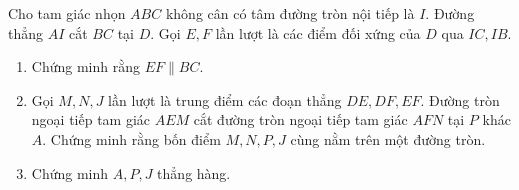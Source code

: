 \begin{ex}%
Cho tam giác nhọn $ABC$ không cân có tâm đường tròn nội tiếp là $I$. Đường thẳng $AI$ cắt $BC$ tại $D$. Gọi $E,F$ lần lượt là các điểm đối xứng của $D$ qua $IC,IB$.
\begin{enumerate}
	\item Chứng minh rằng $EF\parallel BC$.
	\item Gọi $M,N,J$ lần lượt là trung điểm các đoạn thẳng $DE,DF,EF$. Đường tròn ngoại tiếp tam giác $AEM$ cắt đường tròn ngoại tiếp tam giác $AFN$ tại $P$ khác $A$. Chứng minh rằng bốn điểm $M,N,P,J$ cùng nằm trên một đường tròn.
	\item  Chứng minh $A,P,J$ thẳng hàng.
\end{enumerate}
\end{ex}
